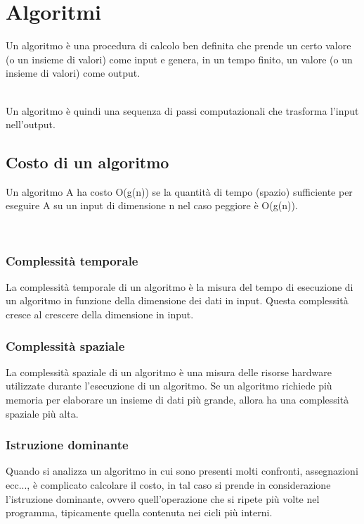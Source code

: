 \chapter{Algoritmi}

\colorbox{SALZO}{\parbox{\dimexpr\linewidth-2\fboxsep}{\begin{definition}
    Un algoritmo è una procedura di calcolo ben definita che prende un certo valore (o un insieme di valori) come input e genera, in un tempo finito, un valore (o un insieme di valori) come output.
\end{definition}}}\medskip\\
Un algoritmo è quindi una sequenza di passi computazionali che trasforma l'input  nell'output.

\section{Costo di un algoritmo}
\colorbox{SALZO}{\parbox{\dimexpr\linewidth-2\fboxsep}{\begin{definition}
    Un algoritmo A ha costo O(g(n)) se la quantità di tempo (spazio) sufficiente per eseguire A su un input di dimensione n nel caso peggiore è O(g(n)).
\end{definition}}}\\
\subsection{Complessità temporale}
La complessità temporale di un algoritmo è la misura del tempo di esecuzione di un algoritmo in funzione della dimensione dei dati in input. Questa complessità cresce al crescere della dimensione in input.

\subsection{Complessità spaziale}
La complessità spaziale di un algoritmo è una misura delle risorse hardware utilizzate durante l'esecuzione di un algoritmo. Se un algoritmo richiede più memoria per elaborare un insieme di dati più grande, allora ha una complessità spaziale più alta.

\subsection{Istruzione dominante}
Quando si analizza un algoritmo in cui sono presenti molti confronti, assegnazioni ecc..., è complicato calcolare il costo, in tal caso si prende in considerazione l'istruzione dominante, ovvero quell'operazione che si ripete più volte nel programma, tipicamente quella contenuta nei cicli più interni.

